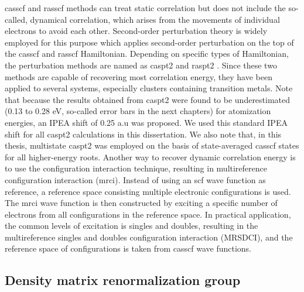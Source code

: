 \begin{refsection}
\acrshort{casscf} and \acrshort{rasscf} methods can treat static correlation but does not include the so-called, dynamical correlation, which arises from the movements of individual electrons to avoid each other. Second-order perturbation theory is widely employed for this purpose which applies second-order perturbation on the top of the \acrshort{casscf} and \acrshort{rasscf} Hamiltonian. Depending on specific types of Hamiltonian, the perturbation methods are named as \acrshort{caspt2} \cite{c1:andersson1992,c1:andersson1990} and \acrshort{raspt2} \cite{c1:malmqvist2008}. Since these two methods are capable of recovering most correlation energy, they have been applied to several systems, especially clusters containing transition metals. Note that because the results obtained from \acrshort{caspt2} were found to be underestimated (0.13 to 0.28 eV, so-called error bars in the next chapters) for atomization energies, \cite{c2:caspt2error} an IPEA shift \cite{c2:IPEA} of 0.25 a.u was proposed. We used this standard IPEA shift for all \acrshort{caspt2} calculations in this dissertation. We also note that, in this thesis, multistate \acrshort{caspt2} was employed on the basis of state-averaged \acrshort{casscf} states for all higher-energy roots. Another way to recover dynamic correlation energy is to use the configuration interaction technique, resulting in multireference configuration interaction (\acrshort{mrci}). Instead of using an \acrshort{scf} wave function as reference, a reference space consisting multiple electronic configurations is used. The \acrshort{mrci} wave function is then constructed by exciting a specific number of electrons from all configurations in the reference space. In practical application, the common levels of excitation is singles and doubles, resulting in the multireference singles and doubles configuration interaction (MRSDCI), and the reference space of configurations is taken from \acrshort{casscf} wave functions.  




\subsection{Density matrix renormalization group}


\end{refsection}
